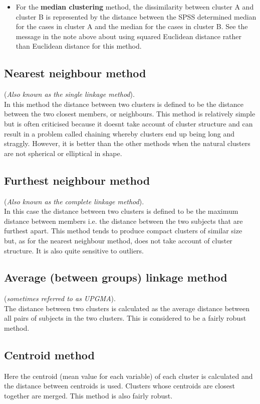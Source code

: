 \documentclass[a4paper,12pt]{article}
\begin{document}
\begin{itemize}
	\item 
	For the \textbf{median clustering} method, the dissimilarity between cluster A and cluster B is represented by the distance between the SPSS determined median for the cases in cluster A and the median for the cases in cluster B.  See the message in the note above about using squared Euclidean distance rather than Euclidean distance for this method.
	
\end{itemize}


\subsection{Nearest neighbour method} 
(\textit{Also known as the single linkage method}).\\
In this method the distance between two clusters is defined to be the distance between
the two closest members, or neighbours. This method is relatively simple but is often
criticised because it doesnt take account of cluster structure and can result in a problem
called chaining whereby clusters end up being long and straggly. However, it is better
than the other methods when the natural clusters are not spherical or elliptical in shape.

\subsection{Furthest neighbour method}
(\textit{Also known as the complete linkage method}).\\
In this case the distance between two clusters is defined to be the maximum distance
between members  i.e. the distance between the two subjects that are furthest apart.
This method tends to produce compact clusters of similar size but, as for the nearest
neighbour method, does not take account of cluster structure. It is also quite sensitive
to outliers.

\subsection{Average (between groups) linkage method }
(\textit{sometimes referred to as UPGMA}).\\
The distance between two clusters is calculated as the average distance between all pairs
of subjects in the two clusters. This is considered to be a fairly robust method.

\subsection{Centroid method}
Here the centroid (mean value for each variable) of each cluster is calculated and the
distance between centroids is used. Clusters whose centroids are closest together are
merged. This method is also fairly robust.
\end{document}

